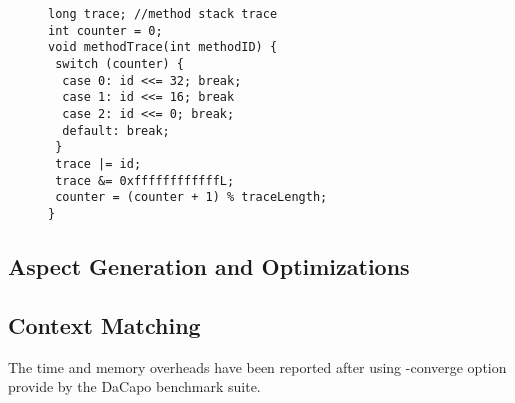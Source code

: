  \begin{figure}[t]
\begin{lstlisting}
long trace; //method stack trace	
int counter = 0;
void methodTrace(int methodID) {
 switch (counter) {
  case 0: id <<= 32; break;
  case 1: id <<= 16; break
  case 2: id <<= 0; break;
  default: break;
 }
 trace |= id;
 trace &= 0xffffffffffffL;
 counter = (counter + 1) % traceLength;
}
\end{lstlisting}
\end{figure}

\subsection{Aspect Generation and Optimizations}
\label{subsec:aspectGen}

\subsection{Context Matching}
\label{subsec:contextMatch}
The time and memory overheads have been reported after using -converge option 
provide by the DaCapo benchmark suite.